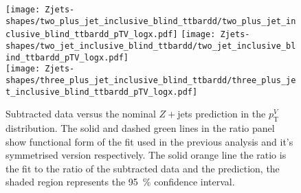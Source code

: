 \begin{figure}[!htb]
  \centering
  \texttt{[image: Zjets-shapes/two\_plus\_jet\_inclusive\_blind\_ttbardd/two\_plus\_jet\_inclusive\_blind\_ttbardd\_pTV\_logx.pdf]}
  \texttt{[image: Zjets-shapes/two\_jet\_inclusive\_blind\_ttbardd/two\_jet\_inclusive\_blind\_ttbardd\_pTV\_logx.pdf]} \\
  \texttt{[image: Zjets-shapes/three\_plus\_jet\_inclusive\_blind\_ttbardd/three\_plus\_jet\_inclusive\_blind\_ttbardd\_pTV\_logx.pdf]}
  \caption[Subtracted data versus the nominal $Z+$jets prediction,
  $p_{\mathrm{T}}^V$.]{Subtracted data versus the nominal $Z+$jets prediction in
    the $p_{\mathrm{T}}^V$ distribution. The solid and dashed green lines in the
    ratio panel show functional form of the fit used in the previous analysis
    and it's symmetrised version respectively. The solid orange line the ratio
    is the fit to the ratio of the subtracted data and the prediction, the
    shaded region represents the 95~\% confidence interval.}
  \label{fig:zjets-ptv-shapes}
\end{figure}